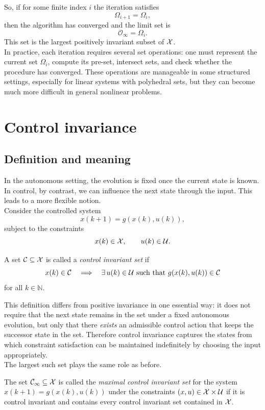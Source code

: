 So, if for some finite index \(i\) the iteration satisfies
\[
\Omega_{i+1}=\Omega_i,
\]
then the algorithm has converged and the limit set is
\[
\mathcal O_\infty=\Omega_i.
\]
This set is the largest positively invariant subset of \(\mathcal{X}\).\\
In practice, each iteration requires several set operations: one must represent the current set
\(\Omega_i\), compute its pre-set, intersect sets, and check whether the procedure has converged.
These operations are manageable in some structured settings, especially for linear systems with
polyhedral sets, but they can become much more difficult in general nonlinear problems.

\section{Control invariance}

\subsection{Definition and meaning}

In the autonomous setting, the evolution is fixed once the current state is known. In control, by
contrast, we can influence the next state through the input. This leads to a more flexible notion.\\
Consider the controlled system
\[
x(k+1)=g(x(k),u(k)),
\]
subject to the constraints
\[
x(k)\in \mathcal{X},\qquad u(k)\in \mathcal{U}.
\]
\begin{theorembox}
A set \(\mathcal C\subseteq \mathcal{X}\) is called a \emph{control invariant set} if
\[
x(k)\in \mathcal C
\quad \Longrightarrow \quad
\exists\,u(k)\in \mathcal{U} \text{ such that } g(x(k),u(k))\in \mathcal C
\]
for all \(k\in \mathbb N\).
\end{theorembox}

This definition differs from positive invariance in one essential way: it does not require that the
next state remains in the set under a fixed autonomous evolution, but only that there \emph{exists}
an admissible control action that keeps the successor state in the set. Therefore control invariance
captures the states from which constraint satisfaction can be maintained indefinitely by choosing
the input appropriately.\\
The largest such set plays the same role as before.

\begin{theorembox}
The set \(\mathcal C_\infty\subseteq \mathcal{X}\) is called the \emph{maximal control invariant set} for the
system \(x(k+1)=g(x(k),u(k))\) under the constraints \((x,u)\in \mathcal{X}\times \mathcal{U}\) if it is control
invariant and contains every control invariant set contained in \(\mathcal{X}\).
\end{theorembox}

